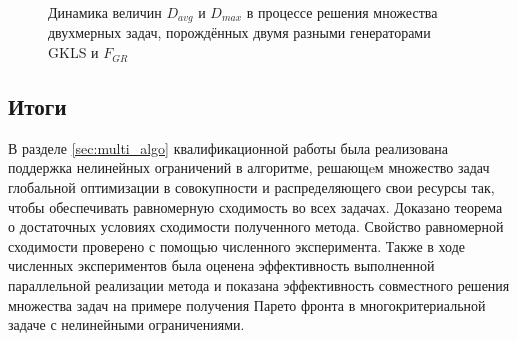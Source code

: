 \begin{figure}[ht]
    \centering
    \caption{Динамика величин \(D_{avg}\) и \(D_{max}\) в процессе решения множества двухмерных задач,
    порождённых двумя разными генераторами GKLS и \(F_{GR}\)}
    \label{fig:devs_mixed}
\end{figure}

\subsection{Итоги}

В разделе \ref{sec:multi_algo} квалификационной работы была реализована поддержка нелинейных ограничений в алгоритме, решающeм
множество задач глобальной оптимизации в совокупности и распределяющего свои ресурсы так, чтобы
обеспечивать равномерную сходимость во всех задачах. Доказано теорема о достаточных условиях сходимости
полученного метода. Свойство равномерной сходимости проверено с помощью численного эксперимента.
Также в ходе численных экспериментов была оценена эффективность выполненной параллельной реализации метода и
показана эффективность совместного решения множества задач на примере получения Парето фронта в многокритериальной задаче с
нелинейными ограничениями.
